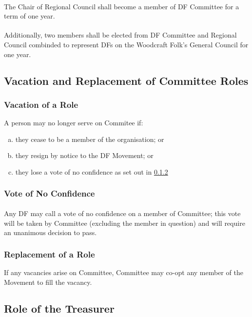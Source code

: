 \documentclass[a4paper, 12pt]{report}
\begin{document}
\paragraph{} The Chair of Regional Council shall become a member of DF Committee for a term of one year.

\paragraph{} Additionally, two members shall be elected from DF Committee and Regional Council combinded to represent DFs on the Woodcraft Folk's General Council for one year.

\subsection{Vacation and Replacement of Committee Roles}
\subsubsection{Vacation of a Role}
A person may no longer serve on Commitee if:
\begin{enumerate}[(a)]
\item they cease to be a member of the organisation; or
\item they resign by notice to the DF Movement; or
\item they lose a vote of no confidence as set out in \ref{sec:noconfidence}
\end{enumerate}
\subsubsection{Vote of No Confidence}
\label{sec:noconfidence}
\paragraph{} Any DF may call a vote of no confidence on a member of Committee; this vote will be taken by Committee (excluding the member in question) and will require an unanimous decision to pass.
\subsubsection{Replacement of a Role}
\label{sec:rolereplacement}
If any vacancies arise on Committee, Committee may co-opt any member of the Movement to fill the vacancy.

\subsection{Role of the Treasurer}
\label{sec:treasurerrole}
\end{document}
